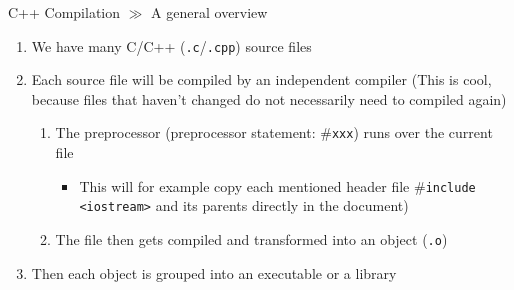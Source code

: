 \documentclass[10pt]{beamer}
\begin{document}
\begin{frame}{C++ Compilation $\gg$ A general overview}
\begin{enumerate}
	\item We have many C/C++ (\texttt{.c}/\texttt{.cpp}) source files
	\item Each source file will be compiled by an independent compiler (This is cool, because files that haven't changed do not necessarily need to compiled again)
	\begin{enumerate}
		\item The preprocessor (preprocessor statement: \#\texttt{xxx}) runs over the current file
		\begin{itemize}
			\item This will for example copy each mentioned header file \#\texttt{include <iostream>} and its parents directly in the document)
		\end{itemize}
		\item The file then gets compiled and transformed into an object (\texttt{.o})
	\end{enumerate}
	\item Then each object is grouped into an executable or a library
\end{enumerate}
\end{frame}
\end{document}

